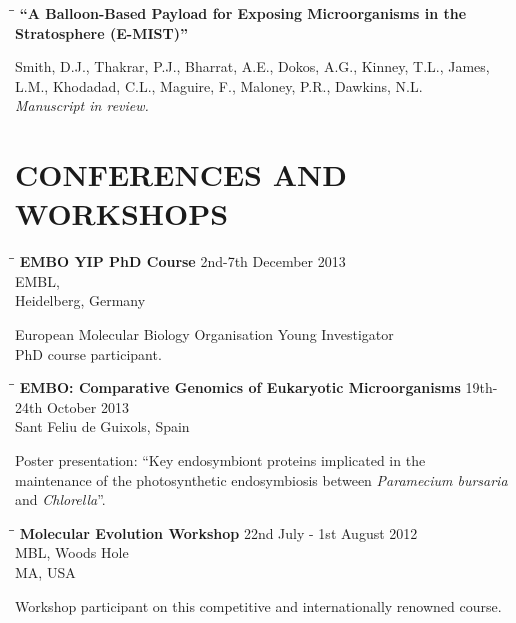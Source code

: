 \documentclass{res}
\begin{document}
\begin{resume}
\vspace{-0.1in}
\begin{tabbing}
   \hspace{2.3in}\= \hspace{2.6in}\= \kill
   {\bf ``A Balloon-Based Payload for Exposing Microorganisms in the Stratosphere (E-MIST)''}
   \end{tabbing}\vspace{-20pt}
Smith, D.J., Thakrar, P.J., Bharrat, A.E., Dokos, A.G., Kinney, T.L., James, L.M., Khodadad, C.L., Maguire, F., Maloney, P.R., Dawkins, N.L.\\
\emph{Manuscript in review.}


\section{CONFERENCES AND WORKSHOPS}
  \vspace{-0.05in}
    
\begin{tabbing}
\hspace{2in}\= \hspace{2.6in}\= \kill
{\bf EMBO YIP PhD Course} \> \> 2nd-7th December 2013\\
\> \> EMBL, \\
\> \> Heidelberg, Germany\\
\end{tabbing}\vspace{-40pt}
European Molecular Biology Organisation Young Investigator \\
PhD course participant.
\newpage
\vspace{-0.1in}
     \begin{tabbing} 
   \hspace{2in}\= \hspace{2.6in}\= \kill 
    {\bf EMBO: Comparative Genomics of Eukaryotic Microorganisms}
    \>  \> 19th-24th October 2013\\
                         \>    \> Sant Feliu de Guixols, Spain
   \end{tabbing}\vspace{-20pt}      
      Poster presentation: ``Key endosymbiont proteins implicated in the \\ maintenance of the photosynthetic endosymbiosis between \textit{Paramecium bursaria} \\ and \textit{Chlorella}''.
      \vspace{-0.1in}

\begin{tabbing}
\hspace{2in}\= \hspace{2.6in}\= \kill
{\bf Molecular Evolution Workshop} \> \> 22nd July - 1st August 2012\\
\> \> MBL, Woods Hole \\
\> \> MA, USA \\
\end{tabbing}\vspace{-40pt}
Workshop participant on this competitive and internationally renowned course.
  

\end{resume}
\end{document}
